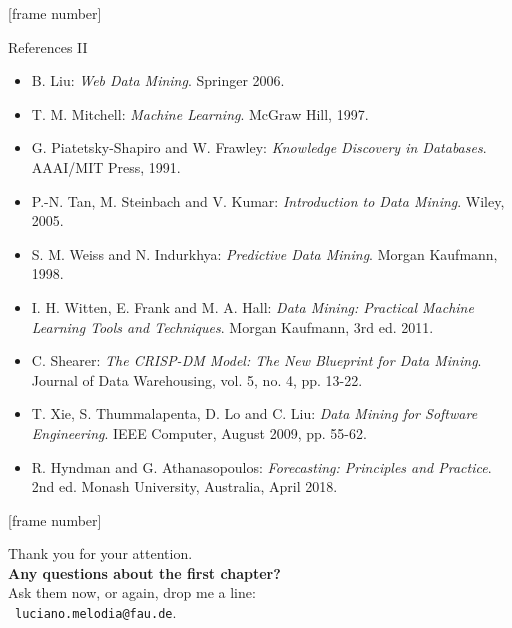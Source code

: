 \documentclass[aspectratio=169,t]{beamer}
\begin{document}
  {
    [frame number]
    \begin{frame}{References II}
        \begin{itemize}
          \item B. Liu: \emph{Web Data Mining}. Springer 2006.
          \item T. M. Mitchell: \emph{Machine Learning}. McGraw Hill, 1997.
          \item G. Piatetsky-Shapiro and W. Frawley: \emph{Knowledge Discovery in Databases}. AAAI/MIT Press, 1991.
          \item P.-N. Tan, M. Steinbach and V. Kumar: \emph{Introduction to Data Mining}. Wiley, 2005.
          \item S. M. Weiss and N. Indurkhya: \emph{Predictive Data Mining}. Morgan Kaufmann, 1998.
          \item I. H. Witten, E. Frank and M. A. Hall: \emph{Data Mining: Practical Machine Learning Tools and Techniques}. Morgan Kaufmann, 3rd ed. 2011.
          \item C. Shearer: \emph{The CRISP-DM Model: The New Blueprint for Data Mining}. Journal of Data Warehousing, vol. 5, no. 4, pp. 13-22.
          \item T. Xie, S. Thummalapenta, D. Lo and C. Liu: \emph{Data Mining for Software Engineering}. IEEE Computer, August 2009, pp. 55-62.
          \item R. Hyndman and G. Athanasopoulos: \emph{Forecasting: Principles and Practice}. 2nd ed. Monash University, Australia, April 2018.
        \end{itemize}
    \end{frame}
  }


  { %
    [frame number]
    \begin{frame}[c]
      \begin{center}
        Thank you for your attention.\\
        {\bf Any questions about the first chapter?}\\[0.5cm]
        Ask them now, or again, drop me a line: \\
        \faSendO \ \texttt{luciano.melodia@fau.de}.
      \end{center}
    \end{frame}
  }
\end{document}
